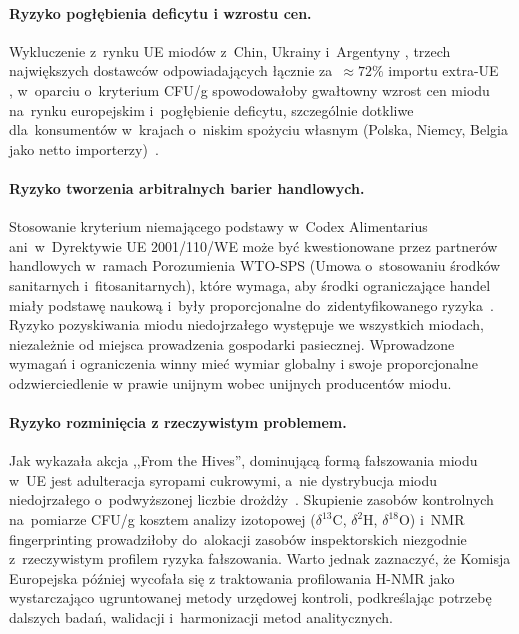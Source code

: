 \paragraph{Ryzyko pogłębienia deficytu i wzrostu cen.}
Wykluczenie z~rynku UE miodów z~Chin, Ukrainy i~Argentyny
, trzech największych dostawców odpowiadających łącznie
za~$\approx 72\%$ importu extra-UE~\cite{tridge2024}
, w~oparciu o~kryterium CFU/g spowodowałoby gwałtowny
wzrost cen miodu na~rynku europejskim i~pogłębienie
deficytu, szczególnie dotkliwe dla~konsumentów w~krajach
o~niskim spożyciu własnym (Polska, Niemcy, Belgia
jako netto importerzy)~\cite{eurostat_honey2023}.

\paragraph{Ryzyko tworzenia arbitralnych barier handlowych.}
Stosowanie kryterium niemającego podstawy w~Codex Alimentarius
ani~w~Dyrektywie UE 2001/110/WE może być kwestionowane
przez partnerów handlowych w~ramach Porozumienia WTO-SPS
(Umowa o~stosowaniu środków sanitarnych i~fitosanitarnych),
które wymaga, aby środki ograniczające handel miały
podstawę naukową i~były proporcjonalne do~zidentyfikowanego
ryzyka~\cite{codex_stan12,eudir2001110}.
Ryzyko pozyskiwania miodu niedojrzałego występuje we wszystkich miodach, niezależnie od miejsca prowadzenia gospodarki pasiecznej. Wprowadzone wymagań i ograniczenia winny mieć wymiar globalny i swoje proporcjonalne  odzwierciedlenie w prawie unijnym wobec unijnych producentów miodu. 


\paragraph{Ryzyko rozminięcia z rzeczywistym problemem.}
Jak wykazała akcja ,,From the Hives'', dominującą
formą fałszowania miodu w~UE jest adulteracja
syropami cukrowymi, a~nie dystrybucja miodu
niedojrzałego o~podwyższonej liczbie drożdży~\cite{eufromhives2021}.
Skupienie zasobów kontrolnych na~pomiarze CFU/g
kosztem analizy izotopowej ($\delta^{13}$C,
$\delta^{2}$H, $\delta^{18}$O) i~NMR fingerprinting
prowadziłoby do~alokacji zasobów inspektorskich
niezgodnie z~rzeczywistym profilem ryzyka fałszowania.
Warto jednak zaznaczyć, że Komisja Europejska później wycofała się z traktowania profilowania H-NMR jako wystarczająco ugruntowanej metody urzędowej kontroli, podkreślając potrzebę dalszych badań, walidacji i~harmonizacji metod analitycznych\cite{EuropeanCommission2023NMR}.



